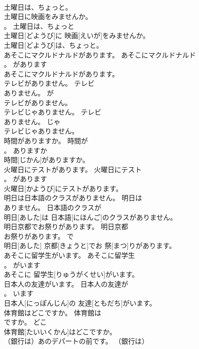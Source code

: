 \documentclass[8pt]{extreport}
\begin{document}
\begin{CJK}{UTF8}{min}
\\	土曜日は、ちょっと。	
\\	土曜日に映画をみませんか。 
\\	。	土曜日は、ちょっと	
\\	土曜日[どようび]に 映画[えいが]をみませんか。 
\\	土曜日[どようび]は、ちょっと。	
\\	あそこにマクルドナルドがあります。	あそこにマクルドナルド
\\	。	があります	
\\	あそこにマクルドナルドがあります。	
\\	テレビがありません。	テレビ
\\	ありません。	が	
\\	テレビがありません。	
\\	テレビじゃありません。	テレビ
\\	ありません。	じゃ	
\\	テレビじゃありません。	
\\	時間がありますか。	時間が
\\	。	ありますか	
\\	時間[じかん]がありますか。	
\\	火曜日にテストがあります。	火曜日にテスト
\\	。	があります	
\\	火曜日[かようび]にテストがあります。	
\\	明日は日本語のクラスがありません。	明日は
\\	ありません。	日本語のクラスが	
\\	明日[あした]は 日本語[にほんご]のクラスがありません。	
\\	明日京都でお祭りがあります。	明日京都
\\	お祭りがあります。	で	
\\	明日[あした] 京都[きょうと]でお 祭[まつ]りがあります。	
\\	あそこに留学生がいます。	あそこに留学生
\\	。	がいます	
\\	あそこに 留学生[りゅうがくせい]がいます。	
\\	日本人の友達がいます。	日本人の友達が
\\	。	います	
\\	日本人[にっぽんじん]の 友達[ともだち]がいます。	
\\	体育館はどこですか。	体育館は
\\	ですか。	どこ	
\\	体育館[たいいくかん]はどこですか。	
\\	（銀行は）あのデパートの前です。	（銀行は）

\end{CJK}
\end{document}
